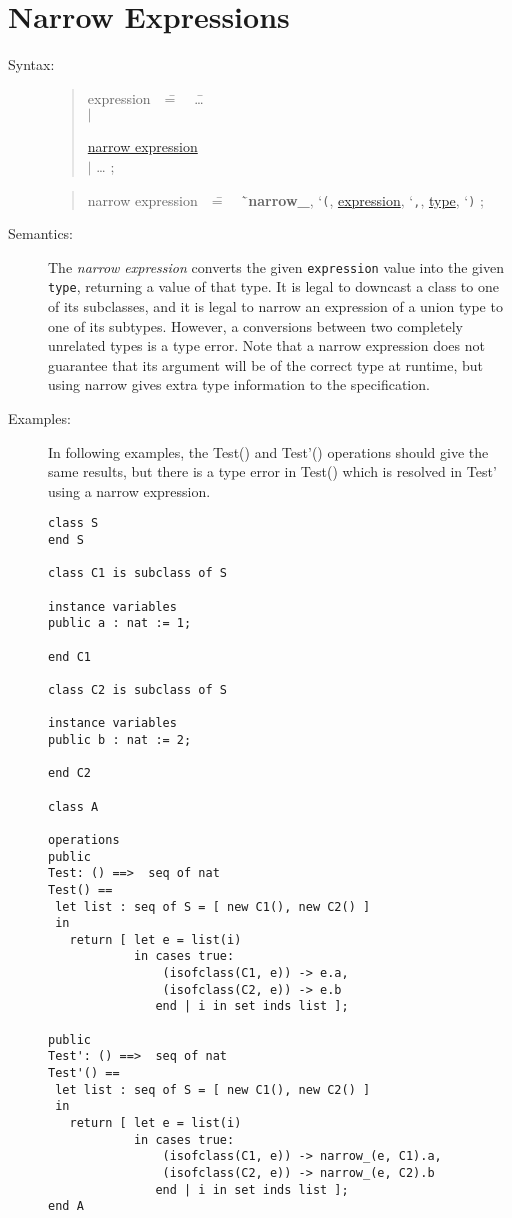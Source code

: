 \documentclass{overturerepchap}
\newcommand{\Lit}[1]{`{\tt #1}\Quote}
\newcommand{\Rule}[2]{
  \begin{quote}\begin{tabbing}
    #1\index{#1}\ \ \= = \ \ \= #2  ; %

  \end{tabbing}\end{quote}
  }
\newcommand{\Ruleref}[1]{
  \hyperlink{rule:#1}{#1}}
\newcommand{\dsep}{\\ \> $|$ \>}
\newcommand{\Lop}[1]{`{\bf\ttfamily #1}\Quote}
\begin{document}
{\section{Narrow Expressions}

\begin{description}
\item[Syntax:]
  \Rule{expression}{
    \ldots \dsep
    \Ruleref{narrow expression} \dsep
    \ldots
    }

  \Rule{narrow expression}{
    \Lop{narrow\_},  \Lit{(}, \Ruleref{expression},  \Lit{,}, \Ruleref{type}, \Lit{)}
    }

    \item[Semantics:] The {\it narrow expression} converts the given {\tt expression} value into the given {\tt type},
returning a value of that type.
It is legal to downcast a class to one of its subclasses, and it is legal to narrow an expression of a union type
to one of its subtypes. However, a conversions between two completely unrelated types is a type error. Note that a
narrow expression does not guarantee that its argument will be of the correct type at runtime, but using narrow gives
extra type information to the specification.

    \item[Examples:] In following examples, the Test() and Test'() operations should give the same results,
    but there is a type error in Test() which is resolved in Test' using a narrow expression.

      \begin{lstlisting}
class S
end S

class C1 is subclass of S

instance variables
public a : nat := 1;

end C1

class C2 is subclass of S

instance variables
public b : nat := 2;

end C2

class A

operations
public
Test: () ==>  seq of nat
Test() ==
 let list : seq of S = [ new C1(), new C2() ]
 in
   return [ let e = list(i)
            in cases true:
                (isofclass(C1, e)) -> e.a,
                (isofclass(C2, e)) -> e.b
               end | i in set inds list ];

public
Test': () ==>  seq of nat
Test'() ==
 let list : seq of S = [ new C1(), new C2() ]
 in
   return [ let e = list(i)
            in cases true:
                (isofclass(C1, e)) -> narrow_(e, C1).a,
                (isofclass(C2, e)) -> narrow_(e, C2).b
               end | i in set inds list ];
end A
      \end{lstlisting}


\end{description}}
\end{document}
